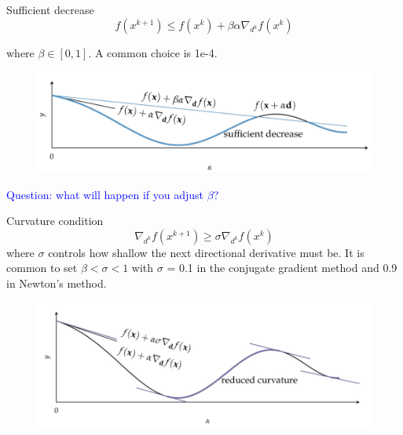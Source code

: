 \documentclass{beamer}
\begin{document}
\begin{frame}{Sufficient decrease}
    \begin{equation*}
        f(x^{k+1}) \leq f(x^k) + \beta\alpha \nabla _{d^k} f(x^k)
    \end{equation*}
    
where $\beta \in [0, 1]$. A common choice is 1e-4.  
\begin{figure}
\centering
\includegraphics[width=120mm]{Figs/sufficient_decrease.jpeg}
\end{figure}

\textcolor{blue}{Question: what will happen if you adjust $\beta$?}
\end{frame}

\begin{frame}{Curvature condition}
    \begin{equation*}
        \nabla _{d^k} f(x^{k+1}) \geq \sigma \nabla _{d^k} f(x^k)
    \end{equation*}
where $\sigma$ controls how shallow the next directional derivative must be.
It is common to set $\beta < \sigma < 1$ with $\sigma$ = 0.1 in the conjugate gradient method and 0.9 in Newton’s method.
\begin{figure}
\centering
\includegraphics[width=120mm]{Figs/curvature1.jpeg}
\end{figure}
\end{frame}
\end{document}
